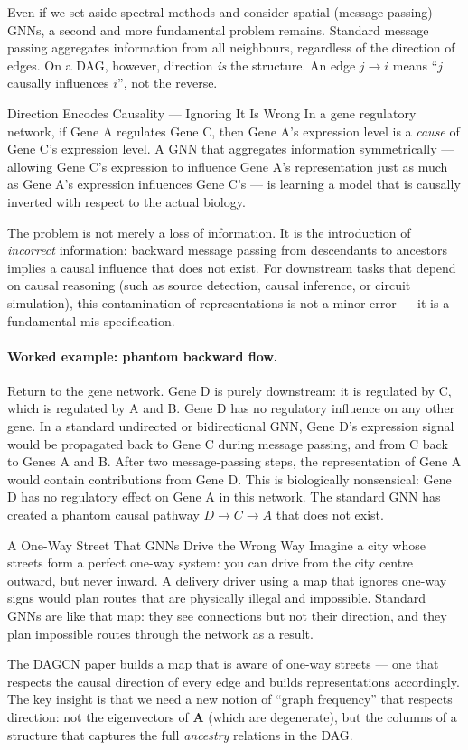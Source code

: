 Even if we set aside spectral methods and consider spatial (message-passing)
GNNs, a second and more fundamental problem remains. Standard message passing
aggregates information from all neighbours, regardless of the direction of
edges. On a DAG, however, direction \emph{is} the structure. An edge $j \to i$
means ``$j$ causally influences $i$'', not the reverse.

\begin{keyinsight}{Direction Encodes Causality --- Ignoring It Is Wrong}
In a gene regulatory network, if Gene A regulates Gene C, then Gene A's
expression level is a \emph{cause} of Gene C's expression level. A GNN that
aggregates information symmetrically --- allowing Gene C's expression to
influence Gene A's representation just as much as Gene A's expression influences
Gene C's --- is learning a model that is causally inverted with respect to the
actual biology.

The problem is not merely a loss of information. It is the introduction of
\emph{incorrect} information: backward message passing from descendants to
ancestors implies a causal influence that does not exist. For downstream tasks
that depend on causal reasoning (such as source detection, causal inference, or
circuit simulation), this contamination of representations is not a minor error
--- it is a fundamental mis-specification.
\end{keyinsight}

\paragraph{Worked example: phantom backward flow.}
Return to the gene network. Gene D is purely downstream: it is regulated by C,
which is regulated by A and B. Gene D has no regulatory influence on any other
gene. In a standard undirected or bidirectional GNN, Gene D's expression signal
would be propagated back to Gene C during message passing, and from C back to
Genes A and B. After two message-passing steps, the representation of Gene A
would contain contributions from Gene D. This is biologically nonsensical: Gene
D has no regulatory effect on Gene A in this network. The standard GNN has
created a phantom causal pathway $D \to C \to A$ that does not exist.

\begin{analogybox}{A One-Way Street That GNNs Drive the Wrong Way}
Imagine a city whose streets form a perfect one-way system: you can drive from
the city centre outward, but never inward. A delivery driver using a map that
ignores one-way signs would plan routes that are physically illegal and
impossible. Standard GNNs are like that map: they see connections but not
their direction, and they plan impossible routes through the network as a result.

The DAGCN paper builds a map that is aware of one-way streets --- one that
respects the causal direction of every edge and builds representations
accordingly. The key insight is that we need a new notion of ``graph frequency''
that respects direction: not the eigenvectors of $\mathbf{A}$ (which are
degenerate), but the columns of a structure that captures the full
\emph{ancestry} relations in the DAG.
\end{analogybox}

